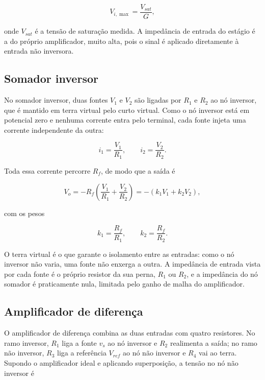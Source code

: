 \documentclass[11pt,a4paper]{article}
\begin{document}
\begin{equation}
V_{i,\max} = \frac{V_{sat}}{G} ,
\label{eq:vi_max}
\end{equation}

onde $V_{sat}$ é a tensão de saturação medida. A impedância de entrada do estágio é a do próprio amplificador, muito alta, pois o sinal é aplicado diretamente à entrada não inversora.

\subsection{Somador inversor}

No somador inversor, duas fontes $V_1$ e $V_2$ são ligadas por $R_1$ e $R_2$ ao nó inversor, que é mantido em terra virtual pelo curto virtual. Como o nó inversor está em potencial zero e nenhuma corrente entra pelo terminal, cada fonte injeta uma corrente independente da outra:

\begin{equation}
i_1 = \frac{V_1}{R_1} , \qquad i_2 = \frac{V_2}{R_2} .
\label{eq:somador_correntes}
\end{equation}

Toda essa corrente percorre $R_f$, de modo que a saída é

\begin{equation}
V_o = -R_f \left( \frac{V_1}{R_1} + \frac{V_2}{R_2} \right) = -(k_1 V_1 + k_2 V_2) ,
\label{eq:somador_saida}
\end{equation}

com os pesos

\begin{equation}
k_1 = \frac{R_f}{R_1} , \qquad k_2 = \frac{R_f}{R_2} .
\label{eq:somador_pesos}
\end{equation}

O terra virtual é o que garante o isolamento entre as entradas: como o nó inversor não varia, uma fonte não enxerga a outra. A impedância de entrada vista por cada fonte é o próprio resistor da sua perna, $R_1$ ou $R_2$, e a impedância do nó somador é praticamente nula, limitada pelo ganho de malha do amplificador.

\subsection{Amplificador de diferença}

O amplificador de diferença combina as duas entradas com quatro resistores. No ramo inversor, $R_1$ liga a fonte $v_s$ ao nó inversor e $R_2$ realimenta a saída; no ramo não inversor, $R_3$ liga a referência $V_{ref}$ ao nó não inversor e $R_4$ vai ao terra. Supondo o amplificador ideal e aplicando superposição, a tensão no nó não inversor é
\end{document}
